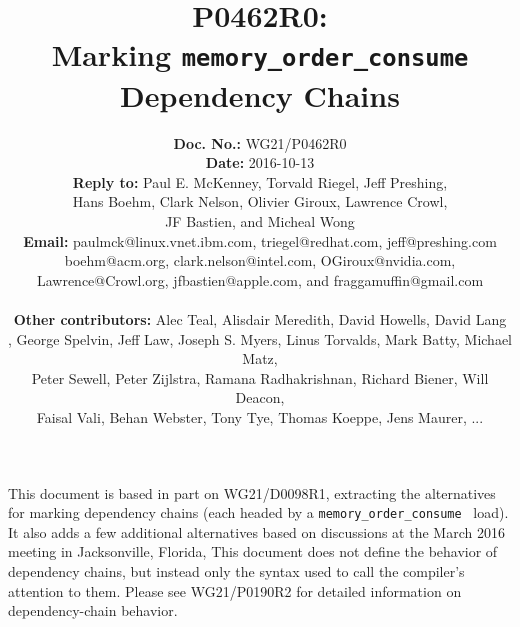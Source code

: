 \documentclass[letterpaper,10pt]{article}
\begin{document}
\newcommand{\co}[1]{\lstinline[breaklines=yes,breakatwhitespace=yes]{#1}}

\title{P0462R0:\\ Marking {\tt memory\_order\_consume} Dependency Chains}

\author{
{\bf Doc. No.: } WG21/P0462R0 \\
{\bf Date: } 2016-10-13 \\
{\bf Reply to: } Paul E. McKenney, Torvald Riegel, Jeff Preshing, \\
	Hans Boehm, Clark Nelson, Olivier Giroux, Lawrence Crowl, \\
	JF Bastien, and Micheal Wong \\
{\bf Email: } paulmck@linux.vnet.ibm.com, triegel@redhat.com,
jeff@preshing.com \\
boehm@acm.org, clark.nelson@intel.com, OGiroux@nvidia.com, \\
Lawrence@Crowl.org, jfbastien@apple.com, and fraggamuffin@gmail.com \\ ~ \\
{\bf Other contributors: }
	Alec Teal,
	Alisdair Meredith,
	David Howells,
	David Lang \\,
	George Spelvin,
	Jeff Law,
	Joseph S. Myers,
	Linus Torvalds,
	Mark Batty,
	Michael Matz, \\
	Peter Sewell,
	Peter Zijlstra,
	Ramana Radhakrishnan,
	Richard Biener,
	Will Deacon, \\
	Faisal Vali,
	Behan Webster,
	Tony Tye,
	Thomas Koeppe,
	Jens Maurer,
	... \\
} %


\pagestyle{myheadings}

\maketitle


This document is based in part on WG21/D0098R1, extracting the
alternatives for marking dependency chains (each headed by a
\co{memory_order_consume}~\cite{RichardSmith2015N4527} load).
It also adds a few additional alternatives based on discussions
at the March 2016 meeting in Jacksonville, Florida,
This document does not define the behavior of dependency chains, but instead
only the syntax used to call the compiler's attention to them.
Please see WG21/P0190R2 for detailed information on dependency-chain behavior.
\end{document}
